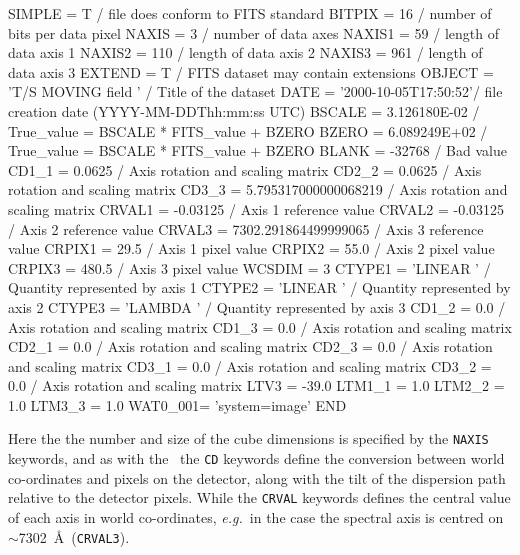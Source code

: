 \documentclass[twoside,11pt]{starlink}
\providecommand{\IRAF}{\footnotesize{IRAF}\normalsize}
\begin{document}
\begin{small}
\begin{terminalv}
SIMPLE  =                    T /  file does conform to FITS standard
BITPIX  =                   16 /  number of bits per data pixel
NAXIS   =                    3 /  number of data axes
NAXIS1  =                   59 /  length of data axis 1
NAXIS2  =                  110 /  length of data axis 2
NAXIS3  =                  961 /  length of data axis 3
EXTEND  =                    T /  FITS dataset may contain extensions
OBJECT  = 'T/S MOVING field  ' /  Title of the dataset
DATE    = '2000-10-05T17:50:52'/  file creation date (YYYY-MM-DDThh:mm:ss UTC)
BSCALE  =         3.126180E-02 /  True_value = BSCALE * FITS_value + BZERO
BZERO   =         6.089249E+02 /  True_value = BSCALE * FITS_value + BZERO
BLANK   =               -32768 /  Bad value
CD1_1   =               0.0625 / Axis rotation and scaling matrix
CD2_2   =               0.0625 / Axis rotation and scaling matrix
CD3_3   = 5.795317000000068219 / Axis rotation and scaling matrix
CRVAL1  =             -0.03125 / Axis 1 reference value
CRVAL2  =             -0.03125 / Axis 2 reference value
CRVAL3  = 7302.291864499999065 / Axis 3 reference value
CRPIX1  =                 29.5 / Axis 1 pixel value
CRPIX2  =                 55.0 / Axis 2 pixel value
CRPIX3  =                480.5 / Axis 3 pixel value
WCSDIM  =                    3
CTYPE1  = 'LINEAR  '           / Quantity represented by axis 1
CTYPE2  = 'LINEAR  '           / Quantity represented by axis 2
CTYPE3  = 'LAMBDA  '           / Quantity represented by axis 3
CD1_2   =                  0.0 / Axis rotation and scaling matrix
CD1_3   =                  0.0 / Axis rotation and scaling matrix
CD2_1   =                  0.0 / Axis rotation and scaling matrix
CD2_3   =                  0.0 / Axis rotation and scaling matrix
CD3_1   =                  0.0 / Axis rotation and scaling matrix
CD3_2   =                  0.0 / Axis rotation and scaling matrix
LTV3    =                -39.0
LTM1_1  =                  1.0
LTM2_2  =                  1.0
LTM3_3  =                  1.0
WAT0_001= 'system=image'
END
\end{terminalv}
\end{small}

Here the the number and size of the cube dimensions is specified by
the \texttt{NAXIS} keywords, and as with the \htmlref{\IRAF\ spectral
format}{sc16_iraf}\normalsize\ the \texttt{CD} keywords define the conversion between
world co-ordinates and pixels on the detector, along with the tilt of
the dispersion path relative to the detector pixels.  While the \texttt{CRVAL} keywords defines the central value of each axis in world
co-ordinates, \emph{e.g.}\ in the case the spectral axis is centred on
$\sim$7302~\AA\ (\texttt{CRVAL3}).
\end{document}
